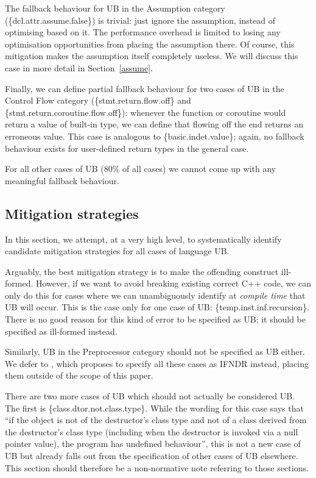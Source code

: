 The fallback behaviour for UB in the Assumption category (\{dcl.attr.assume.false\}) is trivial: just ignore the assumption, instead of optimising based on it. The performance overhead is limited to losing any optimisation opportunities from placing the assumption there. Of course, this mitigation makes the assumption itself completely useless. We will discuss this case in more detail in Section~\ref{assume}.

Finally, we can define partial fallback behaviour for two cases of UB in the Control Flow category  (\{stmt.return.flow.off\} and \{stmt.return.coroutine.flow.off\}): whenever the function or coroutine would return a value of built-in type, we can define that flowing off the end returns an erroneous value. This case is analogous to \{basic.indet.value\}; again, no fallback behaviour exists for user-defined return types in the general case.

For all other cases of UB (80\% of all cases) we cannot come up with any meaningful fallback behaviour.

\subsection{Mitigation strategies}
\label{mitigation}

In this section, we attempt, at a very high level, to systematically identify candidate mitigation strategies for all cases of language UB.

Arguably, the best mitigation strategy is to make the offending construct ill-formed. However, if we want to avoid breaking existing correct C++ code, we can only do this for cases where we can unambiguously identify at \emph{compile time} that UB will occur. This is the case only for one case of UB: 
\{temp.inst.inf.recursion\}. There is no good reason for this kind of error to be specified as UB; it should be specified as ill-formed instead.

Similarly, UB in the Preprocessor category should not be specified as UB either. We defer to \cite{P2843R2}, which proposes to specify all these cases as IFNDR instead, placing them outside of the scope of this paper.

There are two more cases of UB which should not actually be considered UB. The first is \{class.dtor.not.class.type\}. While the wording for this case says that ``if the object is not of the destructor's class type and not of a class derived from the destructor's class type (including when the destructor is invoked via a null pointer value), the program has undefined behaviour'', this is not a new case of UB but already falls out from the specification of other cases of UB elsewhere. This section should therefore be a non-normative note referring to those sections.

